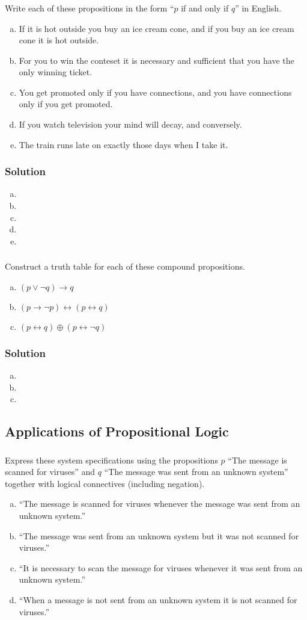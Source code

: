 \documentclass[11pt,a4paper]{article}
\newcommand{\subchapter}[2]{%
\setcounter{subsection}{#1}%
\addtocounter{subsection}{-1}%
\subsection{#2}%
}
\newcommand{\problem}[1]{%
\setcounter{subsubsection}{#1}%
\addtocounter{subsubsection}{-1}%
\subsubsection{\hfill}%
}
\newcommand{\solution}{%
\subsubsection*{Solution}%
}
\DeclareMathOperator{\lthen}{\to}
\DeclareMathOperator{\liff}{\leftrightarrow}
\DeclareMathOperator{\lxor}{\oplus}
\begin{document}
		\problem{25}
			Write each of these propositions in the form ``$p$ if and only if $q$'' in English.
			\begin{enumerate}[a)]
				\item If it is hot outside you buy an ice cream cone, and if you buy an ice cream cone it is hot outside.
				\item For you to win the conteset it is necessary and sufficient that you have the only winning ticket.
				\item You get promoted only if you have connections, and you have connections only if you get promoted.
				\item If you watch television your mind will decay, and conversely.
				\item The train runs late on exactly those days when I take it.
			\end{enumerate}
		\solution{}
			\begin{enumerate}[a)]
				\item 
				\item 
				\item 
				\item 
				\item 
			\end{enumerate}
		\problem{31}
			Construct a truth table for each of these compound propositions.
			\begin{enumerate}[a)]
				\addtocounter{enumi}{2}
				\item $(p \lor \neg q) \lthen q$
				\addtocounter{enumi}{1}
				\item $(p \lthen \neg p) \liff (p \liff q)$
				\item $(p \liff q) \lxor (p \liff \neg q)$
			\end{enumerate}
		\solution{}
			\begin{enumerate}[a)]
				\addtocounter{enumi}{2}
				\item 
				\addtocounter{enumi}{1}
				\item 
				\item 
			\end{enumerate}
	\subchapter{2}{Applications of Propositional Logic}
		\problem{7}
			Express these system specifications using the propositions $p$ ``The message is scanned for viruses'' and $q$ ``The message was sent from an unknown system'' together with logical connectives (including negation).
			\begin{enumerate}[a)]
				\item ``The message is scanned for viruses whenever the message was sent from an unknown system.''
				\item ``The message was sent from an unknown system but it was not scanned for viruses.''
				\item ``It is necessary to scan the message for viruses whenever it was sent from an unknown system.''
				\item ``When a message is not sent from an unknown system it is not scanned for viruses.''
			\end{enumerate}
\end{document}
